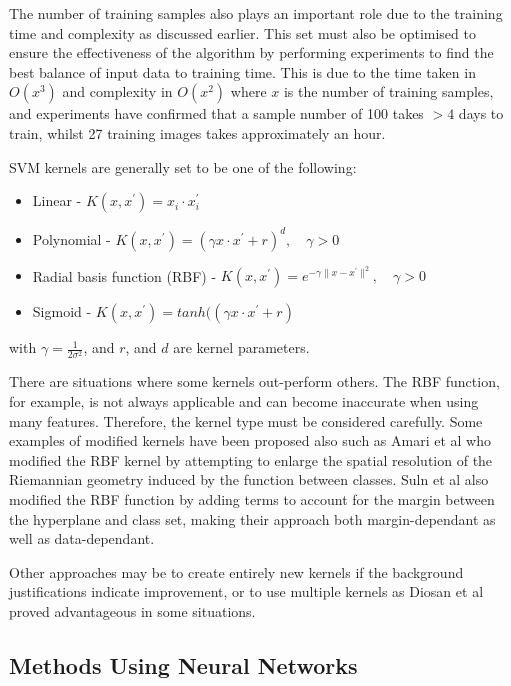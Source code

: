 \documentclass[fleqn,twoside,12pt]{report}
\begin{document}
The number of training samples also plays an important role due to the training time and complexity as discussed earlier. This set must also be optimised to ensure the effectiveness of the algorithm by performing experiments to find the best balance of input data to training time. This is due to the time taken in $O(x^3)$ and complexity in $O(x^2)$ where $x$ is the number of training samples, and experiments have confirmed that a sample number of 100 takes $>4$ days to train, whilst 27 training images takes approximately an hour.  

SVM kernels are generally set to be one of the following:

\begin{itemize}
	\item Linear - $K(x, x^\prime) = x_i \cdot x_i^\prime$
	\item Polynomial - $K(x, x^\prime) = (\gamma x \cdot x^\prime + r) ^d, \quad \gamma > 0 \quad$
	\item Radial basis function (RBF) - $K(x, x^\prime) = e^{-\gamma\|x-x^\prime\|^2},  \quad \gamma > 0 \quad$
	\item Sigmoid - $K(x, x^\prime) = tanh((\gamma x \cdot x^\prime + r)$
\end{itemize}

with $\gamma = \frac{1}{2\sigma^2}$, and $r$, and $d$ are kernel parameters. 

There are situations where some kernels out-perform others. The RBF function, for example, is not always applicable and can become inaccurate when using many features. Therefore, the kernel type must be considered carefully. Some examples of modified kernels have been proposed also such as Amari et al \cite{amari} who modified the RBF kernel by attempting to enlarge the spatial resolution of the Riemannian geometry induced by the function between classes. Suln et al \cite{suln} also modified the RBF function by adding terms to account for the margin between the hyperplane and class set, making their approach both margin-dependant as well as data-dependant. 

Other approaches may be to create entirely new kernels if the background justifications indicate improvement, or to use multiple kernels as Diosan et al \cite{diosan} proved advantageous in some situations.



\subsection{Methods Using Neural Networks}
\end{document}
